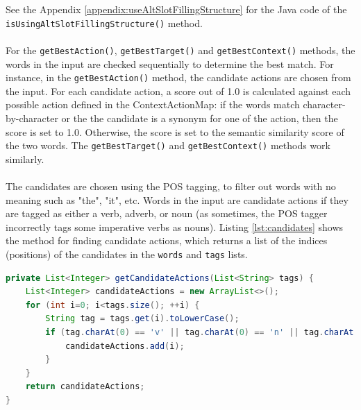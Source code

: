 \documentclass[11pt]{article}
\begin{document}
See the Appendix \ref{appendix:useAltSlotFillingStructure} for the Java code of the \texttt{isUsingAltSlotFillingStructure()} method.
\\
\\
For the \texttt{getBestAction()}, \texttt{getBestTarget()} and  \texttt{getBestContext()} methods, the words in the input are checked sequentially to determine the best match. For instance, in the \texttt{getBestAction()} method, the candidate actions are chosen from the input. For each candidate action, a score out of 1.0 is calculated against each possible action defined in the ContextActionMap: if the words match character-by-character or the the candidate is a synonym for one of the action, then the score is set to 1.0. Otherwise, the score is set to the semantic similarity score of the two words. The \texttt{getBestTarget()} and \texttt{getBestContext()} methods work similarly.
\\
\\
The candidates are chosen using the POS tagging, to filter out words with no meaning such as "the", "it", etc. Words in the input are candidate actions if they are tagged as either a verb, adverb, or noun (as sometimes, the POS tagger incorrectly tags some imperative verbs as nouns). Listing \ref{lst:candidates} shows the method for finding candidate actions, which returns a list of the indices (positions) of the candidates in the \texttt{words} and \texttt{tags} lists.
\\
\begin{lstlisting}[language=Java, caption=getCandidateActions(), label={lst:candidates}]
private List<Integer> getCandidateActions(List<String> tags) {
    List<Integer> candidateActions = new ArrayList<>();
    for (int i=0; i<tags.size(); ++i) {
        String tag = tags.get(i).toLowerCase();
        if (tag.charAt(0) == 'v' || tag.charAt(0) == 'n' || tag.charAt(0) == 'j') {
            candidateActions.add(i);
        }
    }
    return candidateActions;
}
\end{lstlisting}
\end{document}
